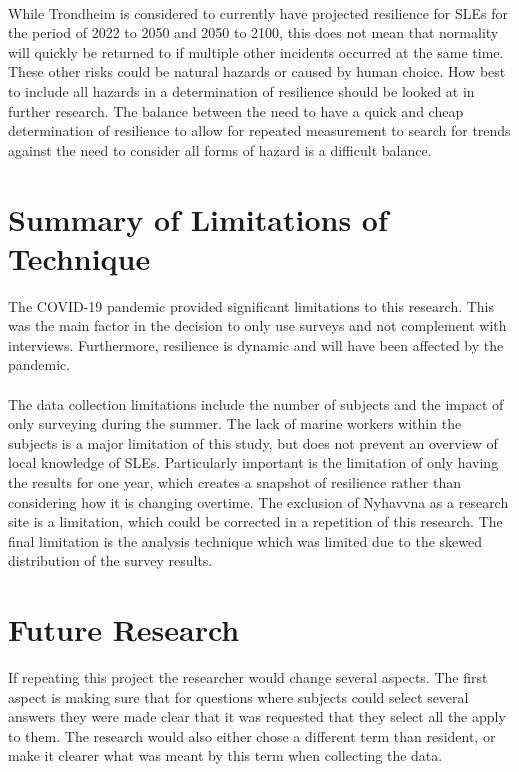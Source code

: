 \paragraph{}
While Trondheim is considered to currently have projected resilience for SLEs for the period of 2022 to 2050 and 2050 to 2100, this does not mean that normality will quickly be returned to if multiple other incidents occurred at the same time. These other risks could be natural hazards or caused by human choice. How best to include all hazards in a determination of resilience should be looked at in further research. The balance between the need to have a quick and cheap determination of resilience to allow for repeated measurement to search for trends against the need to consider all forms of hazard is a difficult balance.
\paragraph{}


\section{Summary of Limitations of Technique}
The COVID-19 pandemic provided significant limitations to this research. This was the main factor in the decision to only use surveys and not complement with interviews. Furthermore, resilience is dynamic and will have been affected by the pandemic. 
\paragraph{}
The data collection limitations include the number of subjects and the impact of only surveying during the summer. The lack of marine workers within the subjects is a major limitation of this study, but does not prevent an overview of local knowledge of SLEs. Particularly important is the limitation of only having the results for one year, which creates a snapshot of resilience rather than considering how it is changing overtime.  The exclusion of Nyhavvna as a research site is a limitation, which could be corrected in a repetition of this research.  The final limitation is the analysis technique which was limited due to the skewed distribution of the survey results.


\section{Future Research}
If repeating this project the researcher would change several aspects. The first aspect is making sure that for questions where subjects could select several answers they were made clear that it was requested that they select all the apply to them. The research would also either chose a different term than resident, or make it clearer what was meant by this term when collecting the data. 
